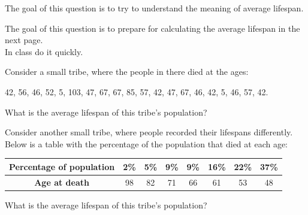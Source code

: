 \question \label{de:averagelifespan}
	The goal of this question is to try to understand the meaning of average lifespan.
\begin{annotation}
\begin{goals}
	The goal of this question is to prepare for calculating the average lifespan in the next page. \\

	In class do it quickly.
\end{goals}
\end{annotation}
\begin{parts}
	\item Consider a small tribe, where the people in there died at the ages:		
		\begin{graybox}
		\begin{center}
			42, 56, 46, 52, 5, 103, 47, 67, 67, 85, 57, 42, 47, 67, 46, 42, 5, 46, 57, 42.
		\end{center}
		\end{graybox}
		What is the average lifespan of this tribe's population? %

	\item  Consider another small tribe, where people recorded their lifespans differently. Below is a table with the percentage of the population that died at each age:
		\begin{graybox}
		\begin{center}
		\begin{tabular}{c||c|c|c|c|c|c|c}
			\textbf{Percentage of population}
				& 2\% & 5\% & 9\% & 9\% & 16\% & 22\% & 37\% \\ \hline
			\textbf{Age at death}
				& 98 & 82 & 71 & 66 & 61 & 53 & 48\\
		\end{tabular}
		\end{center}
		\end{graybox}
		What is the average lifespan of this tribe's population? %
\end{parts}
 

\vfill



\bookonlynewpage



